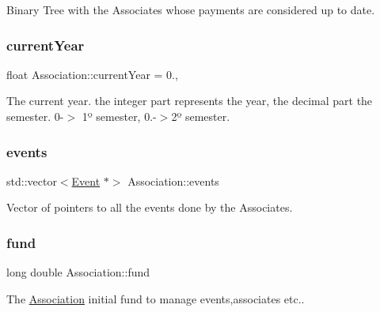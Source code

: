 Binary Tree with the Associates whose payments are considered up to date. 

\mbox{\label{classAssociation_a38c0785b12a067ee6c295a2d3ee453da}} 
\subsubsection{\texorpdfstring{current\+Year}{currentYear}}
{\footnotesize\ttfamily float Association\+::current\+Year = 0.\hspace{0.3cm}{\ttfamily [static]}, {\ttfamily [private]}}



The current year. the integer part represents the year, the decimal part the semester. 0-\/$>$ 1º semester, 0.-\/$>$2º semester. 

\mbox{\label{classAssociation_aaf2b66c89b34895285a108658336df51}} 
\subsubsection{\texorpdfstring{events}{events}}
{\footnotesize\ttfamily std\+::vector$<$\mbox{\hyperlink{classEvent}{Event}} $\ast$$>$ Association\+::events\hspace{0.3cm}{\ttfamily [private]}}



Vector of pointers to all the events done by the Associates. 

\mbox{\label{classAssociation_a891f18ca3dbbbdfa2e8fab54b1683133}} 
\subsubsection{\texorpdfstring{fund}{fund}}
{\footnotesize\ttfamily long double Association\+::fund\hspace{0.3cm}{\ttfamily [private]}}



The \mbox{\hyperlink{classAssociation}{Association}} initial fund to manage events,associates etc.. 

